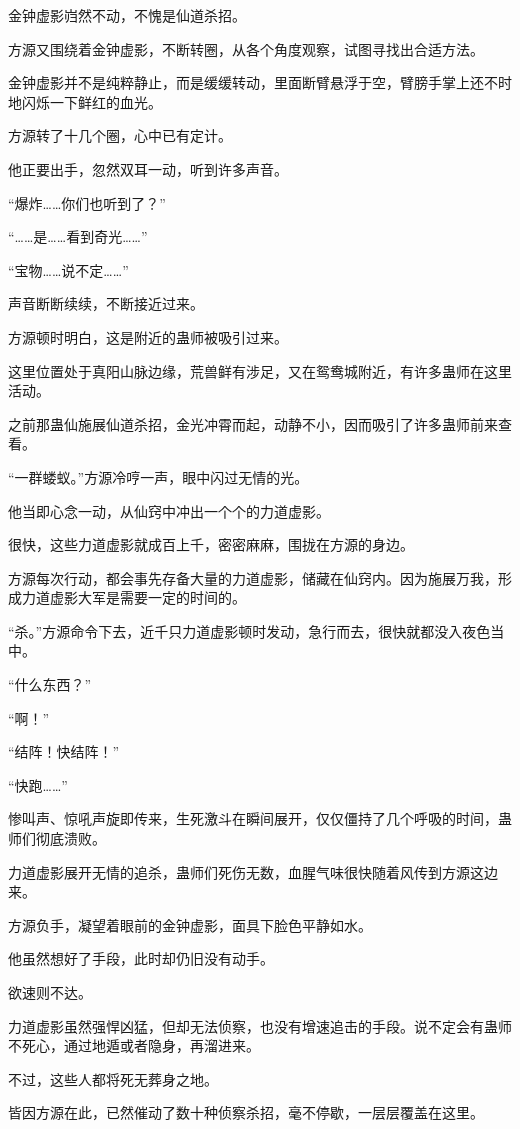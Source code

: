 \begin{this_body}
金钟虚影岿然不动，不愧是仙道杀招。

方源又围绕着金钟虚影，不断转圈，从各个角度观察，试图寻找出合适方法。

金钟虚影并不是纯粹静止，而是缓缓转动，里面断臂悬浮于空，臂膀手掌上还不时地闪烁一下鲜红的血光。

方源转了十几个圈，心中已有定计。

他正要出手，忽然双耳一动，听到许多声音。

“爆炸……你们也听到了？”

“……是……看到奇光……”

“宝物……说不定……”

声音断断续续，不断接近过来。

方源顿时明白，这是附近的蛊师被吸引过来。

这里位置处于真阳山脉边缘，荒兽鲜有涉足，又在鸳鸯城附近，有许多蛊师在这里活动。

之前那蛊仙施展仙道杀招，金光冲霄而起，动静不小，因而吸引了许多蛊师前来查看。

“一群蝼蚁。”方源冷哼一声，眼中闪过无情的光。

他当即心念一动，从仙窍中冲出一个个的力道虚影。

很快，这些力道虚影就成百上千，密密麻麻，围拢在方源的身边。

方源每次行动，都会事先存备大量的力道虚影，储藏在仙窍内。因为施展万我，形成力道虚影大军是需要一定的时间的。

“杀。”方源命令下去，近千只力道虚影顿时发动，急行而去，很快就都没入夜色当中。

“什么东西？”

“啊！”

“结阵！快结阵！”

“快跑……”

惨叫声、惊吼声旋即传来，生死激斗在瞬间展开，仅仅僵持了几个呼吸的时间，蛊师们彻底溃败。

力道虚影展开无情的追杀，蛊师们死伤无数，血腥气味很快随着风传到方源这边来。

方源负手，凝望着眼前的金钟虚影，面具下脸色平静如水。

他虽然想好了手段，此时却仍旧没有动手。

欲速则不达。

力道虚影虽然强悍凶猛，但却无法侦察，也没有增速追击的手段。说不定会有蛊师不死心，通过地遁或者隐身，再溜进来。

不过，这些人都将死无葬身之地。

皆因方源在此，已然催动了数十种侦察杀招，毫不停歇，一层层覆盖在这里。


\end{this_body}
